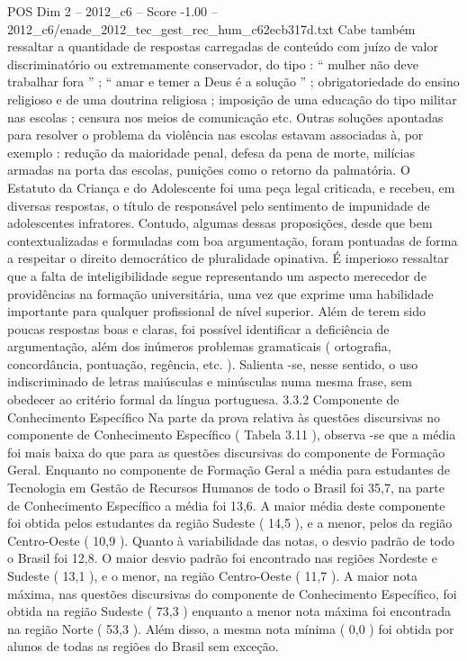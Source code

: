 \begin{textsample}{POS Dim 2 – 2012\_c6 – Score -1.00 – 2012\_c6/enade\_2012\_tec\_gest\_rec\_hum\_c62ecb317d.txt}
Cabe também ressaltar a quantidade de respostas carregadas de conteúdo com juízo de valor discriminatório ou extremamente conservador, do tipo : “ mulher não deve trabalhar fora ” ; “ amar e temer a Deus é a solução ” ; obrigatoriedade do ensino religioso e de uma doutrina religiosa ; imposição de uma educação do tipo militar nas escolas ; censura nos meios de comunicação etc.
Outras soluções apontadas para resolver o problema da violência nas escolas estavam associadas à, por exemplo : redução da maioridade penal, defesa da pena de morte, milícias armadas na porta das escolas, punições como o retorno da palmatória.
O Estatuto da Criança e do Adolescente foi uma peça legal criticada, e recebeu, em diversas respostas, o título de responsável pelo sentimento de impunidade de adolescentes infratores.
Contudo, algumas dessas proposições, desde que bem contextualizadas e formuladas com boa argumentação, foram pontuadas de forma a respeitar o direito democrático de pluralidade opinativa.
É imperioso ressaltar que a falta de inteligibilidade segue representando um aspecto merecedor de providências na formação universitária, uma vez que exprime uma habilidade importante para qualquer profissional de nível superior.
Além de terem sido poucas respostas boas e claras, foi possível identificar a deficiência de argumentação, além dos inúmeros problemas gramaticais ( ortografia, concordância, pontuação, regência, etc. ).
Salienta -se, nesse sentido, o uso indiscriminado de letras maiúsculas e minúsculas numa mesma frase, sem obedecer ao critério formal da língua portuguesa. 3.3.2 Componente de Conhecimento Específico Na parte da prova relativa às questões discursivas no componente de Conhecimento Específico ( Tabela 3.11 ), observa -se que a média foi mais baixa do que para as questões discursivas do componente de Formação Geral.
Enquanto no componente de Formação Geral a média para estudantes de Tecnologia em Gestão de Recursos Humanos de todo o Brasil foi 35,7, na parte de Conhecimento Específico a média foi 13,6.
A maior média deste componente foi obtida pelos estudantes da região Sudeste ( 14,5 ), e a menor, pelos da região Centro-Oeste ( 10,9 ).
Quanto à variabilidade das notas, o desvio padrão de todo o Brasil foi 12,8.
O maior desvio padrão foi encontrado nas regiões Nordeste e Sudeste ( 13,1 ), e o menor, na região Centro-Oeste ( 11,7 ).
A maior nota máxima, nas questões discursivas do componente de Conhecimento Específico, foi obtida na região Sudeste ( 73,3 ) enquanto a menor nota máxima foi encontrada na região Norte ( 53,3 ).
Além disso, a mesma nota mínima ( 0,0 ) foi obtida por alunos de todas as regiões do Brasil sem exceção.

\end{textsample}

